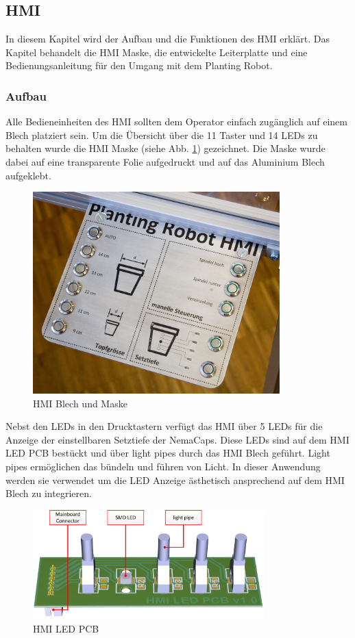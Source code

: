\subsection{HMI} \label{sec:HMI}
In diesem Kapitel wird der Aufbau und die Funktionen des HMI erklärt. Das Kapitel behandelt die HMI Maske, die entwickelte Leiterplatte und eine Bedienungsanleitung für den Umgang mit dem Planting Robot.

\subsubsection{Aufbau}
Alle Bedieneinheiten des HMI sollten dem Operator einfach zugänglich auf einem Blech platziert sein. Um die Übersicht über die 11 Taster und 14 LEDs zu behalten wurde die HMI Maske (siehe Abb. \ref{fig:HMI_Maske}) gezeichnet. Die Maske wurde dabei auf eine transparente Folie aufgedruckt und auf das Aluminium Blech aufgeklebt.

\begin{figure}[H]
	\includegraphics[draft=false,width=0.85\textwidth]{Illustrationen/6-Umsetzung/HMI_Foto.jpg}
	\caption{HMI Blech und Maske}
	\label{fig:HMI_Maske}
\end{figure}

Nebst den LEDs in den Drucktastern verfügt das HMI über 5 LEDs für die Anzeige der einstellbaren Setztiefe der NemaCaps. Diese LEDs sind auf dem HMI LED PCB bestückt und über light pipes durch das HMI Blech geführt. Light pipes ermöglichen das bündeln und führen von Licht. In dieser Anwendung werden sie verwendet um die LED Anzeige ästhetisch ansprechend auf dem HMI Blech zu integrieren.

\begin{figure}[H]
	\includegraphics[draft=false,width=0.8\textwidth]{Illustrationen/6-Umsetzung/LED_PCB_3D.jpg}
	\caption{HMI LED PCB}
	\label{fig:LED_PCB_1}
\end{figure}

